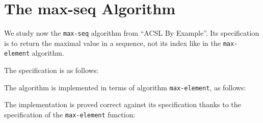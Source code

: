 \section{The \textsf{max-seq} Algorithm}
\label{max-seq}

We study now the \texttt{max-seq} algorithm from ``ACSL By Example''.
Its specification is to return the maximal value in a sequence, not
its index like in the \texttt{max-element} algorithm.

The specification is as follows:


The algorithm is implemented in terms of algorithm
\texttt{max-element}, as follows:


The implementation is proved correct against its specification thanks to the 
specification of the \texttt{max-element} function:

